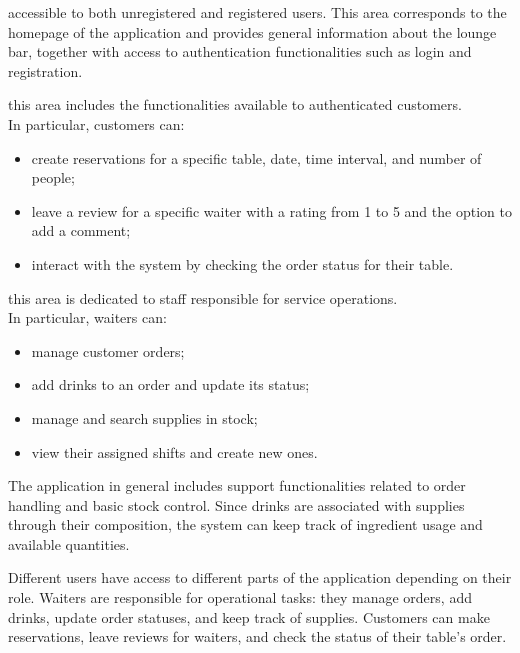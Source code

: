 \documentclass[a4paper]{article}
\begin{document}
\begin{description} [font=\normalfont]
    \item[Public area:] accessible to both unregistered and registered users. This area corresponds to the homepage of the application and provides general information about the lounge bar, together with access to authentication functionalities such as login and registration.

    \item[Customer area:] this area includes the functionalities available to authenticated customers. \\ 
    In particular, customers can:
    \begin{itemize}
        \item create reservations for a specific table, date, time interval, and number of people;
        \item leave a review for a specific waiter with a rating from 1 to 5 and the option to add a comment;
        \item interact with the system by checking the order status for their table.
    \end{itemize}

    \item[Waiter area:] this area is dedicated to staff responsible for service operations. \\
    In particular, waiters can:
    \begin{itemize}
        \item manage customer orders;
        \item add drinks to an order and update its status;
        \item manage and search supplies in stock;
        \item view their assigned shifts and create new ones.
    \end{itemize}
\end{description}



The application in general includes support functionalities related to order handling and basic stock control. Since drinks are associated with supplies through their composition, the system can keep track of ingredient usage and available quantities.

Different users have access to different parts of the application depending on their role. Waiters are responsible for operational tasks: they manage orders, add drinks, update order statuses, and keep track of supplies. Customers can make reservations, leave reviews for waiters, and check the status of their table's order. 
\end{document}
